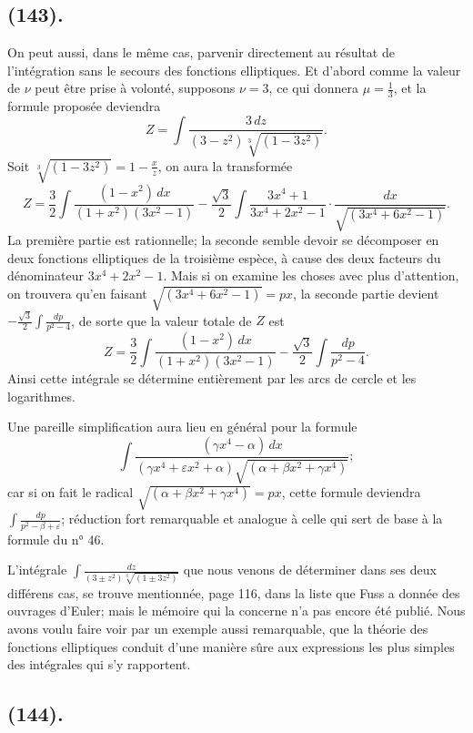 \documentclass{article}
\begin{document}
\subsection*{(143).}

On peut aussi, dans le même cas, parvenir directement au résultat de l'intégration sans le secours des fonctions elliptiques. Et d'abord comme la valeur de $\nu$ peut être prise à volonté, supposons $\nu=3$, ce qui donnera $\mu=\frac{1}{3}$, et la formule proposée deviendra
\[ Z=\int\frac{3\,dz}{(3-z^{2})\sqrt[3]{(1-3z^{2})}}. \]
Soit $\sqrt[3]{(1-3z^{2})}=1-\frac{x}{z}$, on aura la transformée
\[ Z=\frac{3}{2}\int\frac{(1-x^{2})\,dx}{(1+x^{2})(3x^{2}-1)}-\frac{\sqrt{3}}{2}\int\frac{3x^{4}+1}{3x^{4}+2x^{2}-1}\cdot\frac{dx}{\sqrt{(3x^{4}+6x^{2}-1)}}. \]
La première partie est rationnelle; la seconde semble devoir se décomposer en deux fonctions elliptiques de la troisième espèce, à cause des deux facteurs du dénominateur $3x^{4}+2x^{2}-1$. Mais si on examine les choses avec plus d'attention, on trouvera qu'en faisant $\sqrt{(3x^{4}+6x^{2}-1)}=px$, la seconde partie devient $\displaystyle-\frac{\sqrt{3}}{2}\int\frac{dp}{p^{2}-4}$, de sorte que la valeur totale de $Z$ est
\[ Z=\frac{3}{2}\int\frac{(1-x^{2})\,dx}{(1+x^{2})(3x^{2}-1)}-\frac{\sqrt{3}}{2}\int\frac{dp}{p^{2}-4}. \]
Ainsi cette intégrale se détermine entièrement par les arcs de cercle et les logarithmes.


Une pareille simplification aura lieu en général pour la formule
\[ \int\frac{(\gamma x^{4}-\alpha)\,dx}{(\gamma x^{4}+\varepsilon x^{2}+\alpha)\sqrt{(\alpha+\beta x^{2}+\gamma x^{4})}}; \]
car si on fait le radical $\sqrt{(\alpha+\beta x^{2}+\gamma x^{4})}=px$, cette formule deviendra $\displaystyle\int\frac{dp}{p^{2}-\beta+\varepsilon}$; réduction fort remarquable et analogue à celle qui sert de base à la formule du n° 46.

L'intégrale $\displaystyle\int\frac{dz}{(3\pm z^{2})\sqrt[3]{(1\pm 3z^{2})}}$ que nous venons de déterminer dans ses deux différens cas, se trouve mentionnée, page 116, dans la liste que Fuss a donnée des ouvrages d'Euler; mais le mémoire qui la concerne n'a pas encore été publié. Nous avons voulu faire voir par un exemple aussi remarquable, que la théorie des fonctions elliptiques conduit d'une manière sûre aux expressions les plus simples des intégrales qui s'y rapportent.

\subsection*{(144).}
\end{document}
